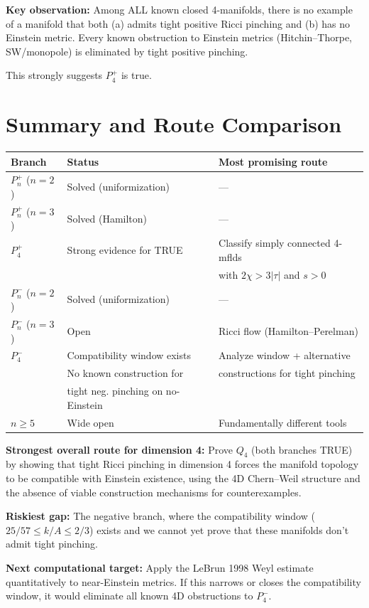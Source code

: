 \textbf{Key observation:} Among ALL known closed 4-manifolds, there is no example of a 
manifold that both (a) admits tight positive Ricci pinching and (b) has no Einstein metric.
Every known obstruction to Einstein metrics (Hitchin--Thorpe, SW/monopole) is eliminated
by tight positive pinching.

This strongly suggests $P_4^+$ is true.


\section{Summary and Route Comparison}

\begin{center}
\begin{tabular}{|l|l|l|}
\hline
\textbf{Branch} & \textbf{Status} & \textbf{Most promising route} \\
\hline
$P_n^+$ ($n=2$) & Solved (uniformization) & --- \\
$P_n^+$ ($n=3$) & Solved (Hamilton) & --- \\
$P_4^+$ & Strong evidence for TRUE & Classify simply connected 4-mflds \\
 & & with $2\chi > 3|\tau|$ and $s > 0$ \\
\hline
$P_n^-$ ($n=2$) & Solved (uniformization) & --- \\
$P_n^-$ ($n=3$) & Open & Ricci flow (Hamilton--Perelman) \\
$P_4^-$ & Compatibility window exists & Analyze window + alternative \\
 & No known construction for & constructions for tight pinching \\
 & tight neg. pinching on no-Einstein & \\
\hline
$n \geq 5$ & Wide open & Fundamentally different tools \\
\hline
\end{tabular}
\end{center}

\textbf{Strongest overall route for dimension 4:}
Prove $Q_4$ (both branches TRUE) by showing that tight Ricci pinching in dimension 4
forces the manifold topology to be compatible with Einstein existence, using the 4D
Chern--Weil structure and the absence of viable construction mechanisms for counterexamples.

\textbf{Riskiest gap:}
The negative branch, where the compatibility window ($25/57 \leq k/A \leq 2/3$) exists
and we cannot yet prove that these manifolds don't admit tight pinching.

\textbf{Next computational target:}
Apply the LeBrun 1998 Weyl estimate quantitatively to near-Einstein metrics.
If this narrows or closes the compatibility window, it would eliminate all known
4D obstructions to $P_4^-$.
